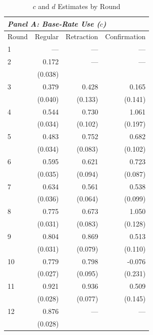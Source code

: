 \begin{table}[htbp]
\centering
\caption{$c$ and $d$ Estimates by Round}
\label{tab:cd_by_round}
\begin{tabular}{lrrr}
\hline
\multicolumn{4}{l}{\textit{Panel A: Base-Rate Use ($c$)}} \\
\hline
Round & Regular & Retraction & Confirmation \\
\hline
1 & --- & --- & ---
 \\
2 & 0.172 & --- & ---
 \\
 & (0.038) &  & 
 \\
3 & 0.379 & 0.428 & 0.165
 \\
 & (0.040) & (0.133) & (0.141)
 \\
4 & 0.544 & 0.730 & 1.061
 \\
 & (0.034) & (0.102) & (0.197)
 \\
5 & 0.483 & 0.752 & 0.682
 \\
 & (0.034) & (0.083) & (0.102)
 \\
6 & 0.595 & 0.621 & 0.723
 \\
 & (0.035) & (0.094) & (0.087)
 \\
7 & 0.634 & 0.561 & 0.538
 \\
 & (0.036) & (0.064) & (0.099)
 \\
8 & 0.775 & 0.673 & 1.050
 \\
 & (0.031) & (0.083) & (0.128)
 \\
9 & 0.804 & 0.869 & 0.513
 \\
 & (0.031) & (0.079) & (0.110)
 \\
10 & 0.779 & 0.798 & -0.076
 \\
 & (0.027) & (0.095) & (0.231)
 \\
11 & 0.921 & 0.936 & 0.509
 \\
 & (0.028) & (0.077) & (0.145)
 \\
12 & 0.876 & --- & ---
 \\
 & (0.028) &  & 
 \\
\hline


\end{tabular}
\end{table}
